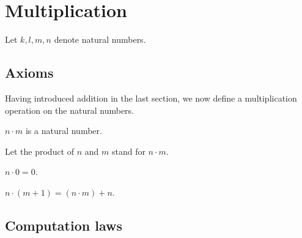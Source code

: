\documentclass[../../arithmetic.ftl.tex]{subfiles}
\begin{document}
  \begin{comment}
    \begin{forthel}

    \end{forthel}
  \end{comment}


  \section{Multiplication}

  \begin{forthel}
  \end{forthel}

  \begin{forthel}
    Let $k, l, m, n$ denote natural numbers.
  \end{forthel}


  \subsection{Axioms}

  Having introduced addition in the last section, we now define a multiplication
  operation on the natural numbers.

  \begin{forthel}
    \begin{signature}
      $n \cdot m$ is a natural number.
    \end{signature}

    Let the product of $n$ and $m$ stand for $n \cdot m$.

    \begin{axiom}\label{Arithmetic_01_03_374176}
      $n \cdot 0 = 0$.
    \end{axiom}

    \begin{axiom}\label{Arithmetic_01_03_667207}
      $n \cdot (m + 1) = (n \cdot m) + n$.
    \end{axiom}
  \end{forthel}


  \subsection{Computation laws}
\end{document}
